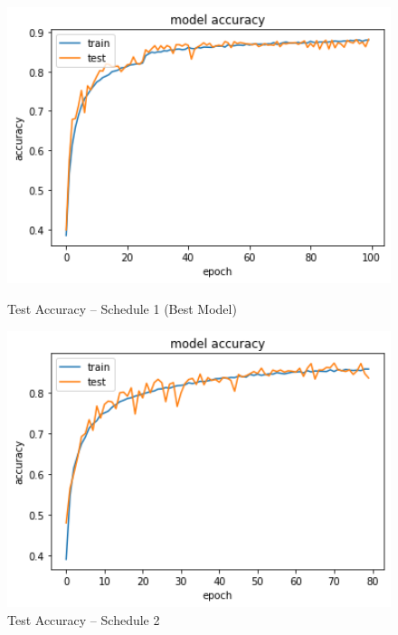 \documentclass[12pt]{article}
\begin{document}
\begin{figure}[htbp]
  \centering
  \begin{minipage}{0.33\textwidth}
    \centering
    \includegraphics[width=1\textwidth]{results/acc-best.png} %
    \caption{Test Accuracy -- Schedule 1 (Best Model)}
    \label{sch1}
  \end{minipage}\hfill
  \begin{minipage}{0.33\textwidth}
    \centering
    \includegraphics[width=1\textwidth]{results/acc-4.png} %
    \caption{Test Accuracy -- Schedule 2}
  \end{minipage}\hfill
  \begin{minipage}{0.33\textwidth}
    \centering

\end{minipage}
\end{figure}
\end{document}
